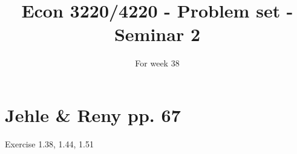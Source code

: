 \documentclass{article}
\title{Econ 3220/4220 - Problem set - Seminar 2 }
\date{For week 38}
\begin{document}
\maketitle


\section*{Jehle \& Reny pp. 67}

Exercise 1.38, 1.44, 1.51
\end{document}

